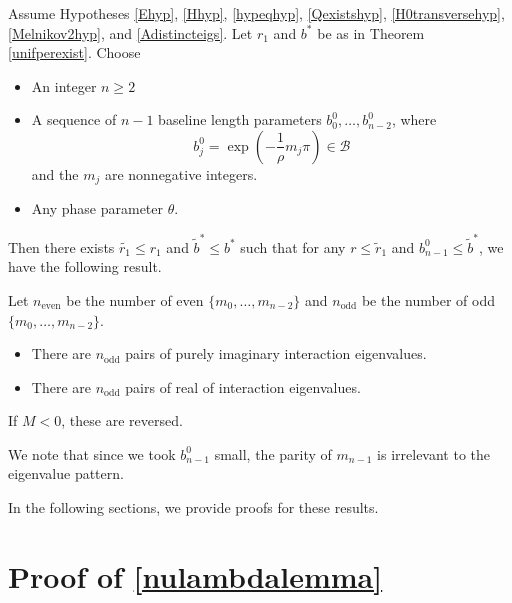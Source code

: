 \documentclass[thesis.tex]{subfiles}
\begin{document}
\begin{theorem}\label{inteigsparity}
Assume Hypotheses \ref{Ehyp}, \ref{Hhyp}, \ref{hypeqhyp}, \ref{Qexistshyp}, \ref{H0transversehyp}, \ref{Melnikov2hyp}, and \ref{Adistincteigs}. Let $r_1$ and $b^*$ be as in Theorem \ref{unifperexist}. Choose
\begin{itemize}
\item An integer $n \geq 2$ 
\item A sequence of $n-1$ baseline length parameters $b_0^0, \dots, b_{n-2}^0$, where 
\[
b_j^0 = \exp\left(-\frac{1}{\rho}m_j \pi\right) \in \mathcal{B}
\]
and the $m_j$ are nonnegative integers.
\item Any phase parameter $\theta$.
\end{itemize}

Then there exists $\tilde{r_1} \leq r_1$ and $\tilde{b}^* \leq b^*$ such that for any $r \leq \tilde{r}_1$ and $b_{n-1}^0 \leq \tilde{b}^*$, we have the following result. 

Let $n_{\text{even}}$ be the number of even $\{m_0, \dots, m_{n-2}\}$ and $n_{\text{odd}}$ be the number of odd $\{m_0, \dots, m_{n-2}\}$. 

\begin{itemize}
\item There are $n_{\text{odd}}$ pairs of purely imaginary interaction eigenvalues.
\item There are $n_{\text{odd}}$ pairs of real of interaction eigenvalues.
\end{itemize}
If $M < 0$, these are reversed.
\end{theorem} 

We note that since we took $b_{n-1}^0$ small, the parity of $m_{n-1}$ is irrelevant to the eigenvalue pattern.

In the following sections, we provide proofs for these results.

\section{Proof of \cref{nulambdalemma} }
\end{document}
